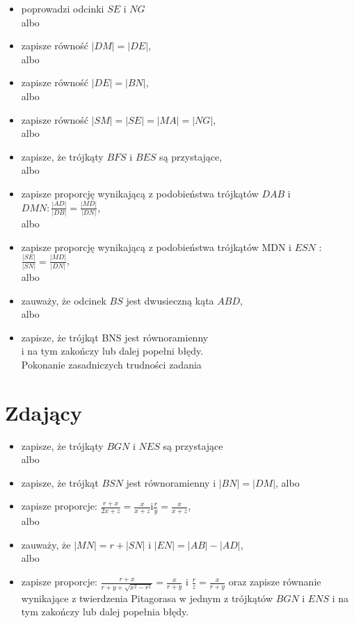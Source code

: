 \documentclass[10pt]{article}
\begin{document}
\begin{itemize}
  \item poprowadzi odcinki $S E$ i $N G$\\
albo
  \item zapisze równość $|D M|=|D E|$,\\
albo
  \item zapisze równość $|D E|=|B N|$,\\
albo
  \item zapisze równość $|S M|=|S E|=|M A|=|N G|$,\\
albo
  \item zapisze, że trójkąty $B F S$ i $B E S$ są przystające,\\
albo
  \item zapisze proporcję wynikającą z podobieństwa trójkątów $D A B$ i $D M N: \frac{|A D|}{|D B|}=\frac{|M D|}{|D N|}$,\\
albo
  \item zapisze proporcję wynikającą z podobieństwa trójkątów MDN i $E S N$ : $\frac{|S E|}{|S N|}=\frac{|M D|}{|D N|}$,\\
albo
  \item zauważy, że odcinek $B S$ jest dwusieczną kąta $A B D$,\\
albo
  \item zapisze, że trójkąt BNS jest równoramienny\\
i na tym zakończy lub dalej popełni błędy.\\
Pokonanie zasadniczych trudności zadania
\end{itemize}

\section*{Zdający}
\begin{itemize}
  \item zapisze, że trójkąty $B G N$ i $N E S$ są przystające\\
albo
  \item zapisze, że trójkąt $B S N$ jest równoramienny i $|B N|=|D M|$, albo
  \item zapisze proporcje: $\frac{r+x}{2 x+z}=\frac{x}{x+z} \mathrm{i} \frac{r}{y}=\frac{x}{x+z}$,\\
albo
  \item zauważy, że $|M N|=r+|S N|$ i $|E N|=|A B|-|A D|$,\\
albo
  \item zapisze proporcje: $\frac{r+x}{r+y+\sqrt{x^{2}-r^{2}}}=\frac{x}{r+y}$ i $\frac{r}{z}=\frac{x}{r+y}$ oraz zapisze równanie wynikające z twierdzenia Pitagorasa w jednym z trójkątów $B G N$ i $E N S$ i na tym zakończy lub dalej popełnia błędy.
\end{itemize}
\end{document}
